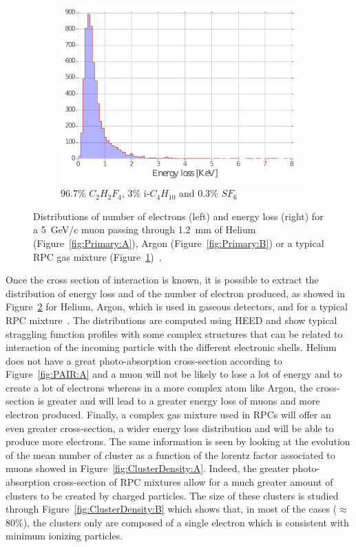 \begin{figure}[H]
\begin{subfigure}{\linewidth}
			\includegraphics[width = 0.5\plotwidth]{fig/chapt4/E_loss_RPC.pdf}
			\caption{\label{fig:Primary:C} 96.7\% $C_2H_2F_4$, 3\% i-$C_4H_{10}$ and 0.3\% $SF_6$~\cite{RIEGLER2003}}
		\end{subfigure}
		\caption{\label{fig:Primary} Distributions of number of electrons (left) and energy loss (right) for a \SI{5}{GeV/c} muon passing through \SI{1.2}{mm} of Helium (Figure~\ref{fig:Primary:A}), Argon (Figure~\ref{fig:Primary:B}) or a typical RPC gas mixture (Figure~\ref{fig:Primary:C})~\cite{VINCENT2017}.}
	\end{figure}
	
	Once the cross section of interaction is known, it is possible to extract the distribution of energy loss and of the number of electron produced, as showed in Figure~\ref{fig:Primary} for Helium, Argon, which is used in gaseous detectors, and for a typical RPC mixture~\cite{VINCENT2017}. The distributions are computed using HEED and show typical straggling function profiles with some complex structures that can be related to interaction of the incoming particle with the different electronic shells. Helium does not have a great photo-absorption cross-section according to Figure~\ref{fig:PAIR:A} and a muon will not be likely to lose a lot of energy and to create a lot of electrons whereas in a more complex atom like Argon, the cross-section is greater and will lead to a greater energy loss of muons and more electron produced. Finally, a complex gas mixture used in RPCs will offer an even greater cross-section, a wider energy loss distribution and will be able to produce more electrons. The same information is seen by looking at the evolution of the mean number of cluster as a function of the lorentz factor associated to muons showed in Figure~\ref{fig:ClusterDensity:A}. Indeed, the greater photo-absorption cross-section of RPC mixtures allow for a much greater amount of clusters to be created by charged particles. The size of these clusters is studied through Figure~\ref{fig:ClusterDensity:B} which shows that, in most of the cases ($\approx$80\%), the clusters only are composed of a single electron which is consistent with minimum ionizing particles.
	
